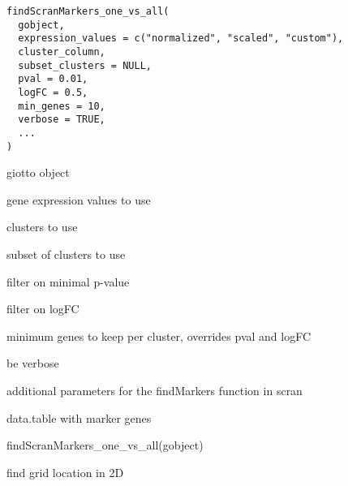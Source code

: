 \documentclass[a4paper]{book}
\begin{document}
%
\begin{Usage}
\begin{verbatim}
findScranMarkers_one_vs_all(
  gobject,
  expression_values = c("normalized", "scaled", "custom"),
  cluster_column,
  subset_clusters = NULL,
  pval = 0.01,
  logFC = 0.5,
  min_genes = 10,
  verbose = TRUE,
  ...
)
\end{verbatim}
\end{Usage}
%
\begin{Arguments}
\begin{ldescription}
\item[\code{gobject}] giotto object

\item[\code{expression\_values}] gene expression values to use

\item[\code{cluster\_column}] clusters to use

\item[\code{subset\_clusters}] subset of clusters to use

\item[\code{pval}] filter on minimal p-value

\item[\code{logFC}] filter on logFC

\item[\code{min\_genes}] minimum genes to keep per cluster, overrides pval and logFC

\item[\code{verbose}] be verbose

\item[\code{...}] additional parameters for the findMarkers function in scran
\end{ldescription}
\end{Arguments}
%
\begin{Value}
data.table with marker genes
\end{Value}
%
\begin{SeeAlso}\relax
{}
\end{SeeAlso}
%
\begin{Examples}
\begin{ExampleCode}
    findScranMarkers_one_vs_all(gobject)
\end{ExampleCode}
\end{Examples}
%
\begin{Description}\relax
find grid location in 2D
\end{Description}
\end{document}
